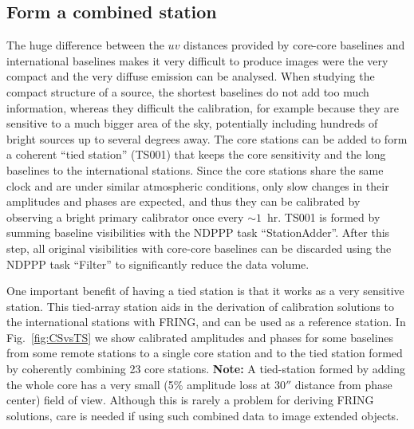 \documentclass[graybox]{svmult}
\begin{document}
\subsection{Form a combined station}

The huge difference between the $uv$ distances provided by core-core baselines
and international baselines makes it very difficult to produce images were the
very compact and the very diffuse emission can be analysed. When studying the
compact structure of a source, the shortest baselines do not add too much
information, whereas they difficult the calibration, for example because they
are sensitive to a much bigger area of the sky, potentially including hundreds
of bright sources up to several degrees away. The core stations can be added to
form a coherent ``tied station'' (TS001) that keeps the core sensitivity and
the long baselines to the international stations. Since the core stations share
the same clock and are under similar atmospheric conditions, only slow changes
in their amplitudes and phases are expected, and thus they can be calibrated by
observing a bright primary calibrator once every $\sim1$~hr. TS001 is formed by
summing baseline visibilities with the NDPPP task ``StationAdder''.  After this
step, all original visibilities with core-core baselines can be discarded using
the NDPPP task ``Filter'' to significantly reduce the data volume.

One important benefit of having a tied station is that it works as a very
sensitive station. This tied-array station aids in the derivation of
calibration solutions to the international stations with FRING, and can be used
as a reference station. In Fig.~\ref{fig:CSvsTS} we show calibrated amplitudes
and phases for some baselines from some remote stations to a single core
station and to the tied station formed by coherently combining 23 core stations.
{\bf Note:} A tied-station formed by adding the whole core 
has a very small (5\% amplitude loss at 30$''$ distance from phase center) 
field of view. Although this is rarely a problem for deriving FRING solutions,
care is needed if using such combined data to image extended objects.
\end{document}
